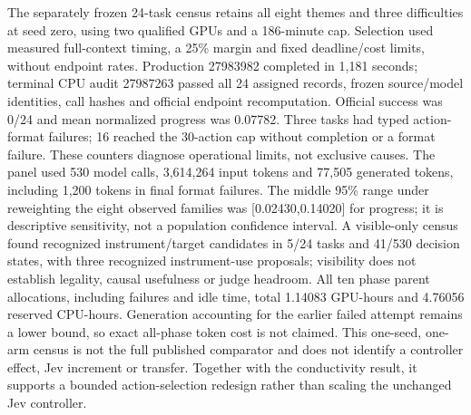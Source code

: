 \documentclass[11pt]{article}
\begin{document}
The separately frozen 24-task census retains all eight themes and three difficulties at seed zero, using two qualified GPUs and a 186-minute cap. Selection used measured full-context timing, a 25\% margin and fixed deadline/cost limits, without endpoint rates. Production 27983982 completed in 1,181 seconds; terminal CPU audit 27987263 passed all 24 assigned records, frozen source/model identities, call hashes and official endpoint recomputation. Official success was 0/24 and mean normalized progress was 0.07782. Three tasks had typed action-format failures; 16 reached the 30-action cap without completion or a format failure. These counters diagnose operational limits, not exclusive causes. The panel used 530 model calls, 3,614,264 input tokens and 77,505 generated tokens, including 1,200 tokens in final format failures. The middle 95\% range under reweighting the eight observed families was [0.02430,0.14020] for progress; it is descriptive sensitivity, not a population confidence interval. A visible-only census found recognized instrument/target candidates in 5/24 tasks and 41/530 decision states, with three recognized instrument-use proposals; visibility does not establish legality, causal usefulness or judge headroom. All ten phase parent allocations, including failures and idle time, total 1.14083 GPU-hours and 4.76056 reserved CPU-hours. Generation accounting for the earlier failed attempt remains a lower bound, so exact all-phase token cost is not claimed. This one-seed, one-arm census is not the full published comparator and does not identify a controller effect, Jev increment or transfer. Together with the conductivity result, it supports a bounded action-selection redesign rather than scaling the unchanged Jev controller.
\end{document}
